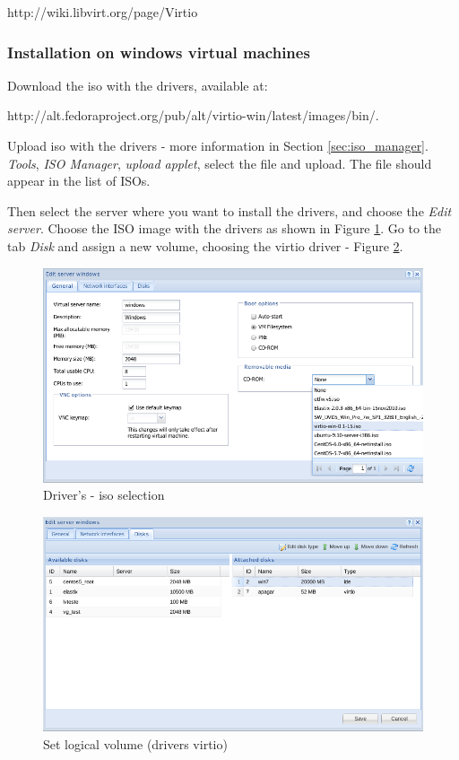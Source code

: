 http://wiki.libvirt.org/page/Virtio

\subsubsection*{Installation on windows virtual machines}

Download the iso with the drivers, available at:

http://alt.fedoraproject.org/pub/alt/virtio-win/latest/images/bin/.

Upload iso with the drivers - more information in Section \ref{sec:iso_manager}. \textit{Tools}, \textit{ISO Manager}, \textit{upload applet}, select the file and upload. The file should appear in the list of ISOs.

Then select the server where you want to install the drivers, and choose the \textit{Edit server}. Choose the ISO image with the drivers as shown in Figure \ref{fig:virtio4}. Go to the tab \textit{Disk} and assign a new volume, choosing the virtio driver - Figure \ref{fig:virtio7}.

\begin{figure}[H]
	\begin{center}
	\includegraphics[scale=0.5]{screenshots/virtio/virtio_4.png}
	\caption{Driver's - iso selection}
	\label{fig:virtio4}
	\end{center}
\end{figure}

\begin{figure}[H]
	\begin{center}
	\includegraphics[scale=0.5]{screenshots/virtio/virtio_7.png}
	\caption{Set logical volume (drivers virtio)}
	\label{fig:virtio7}
	\end{center}
\end{figure}

